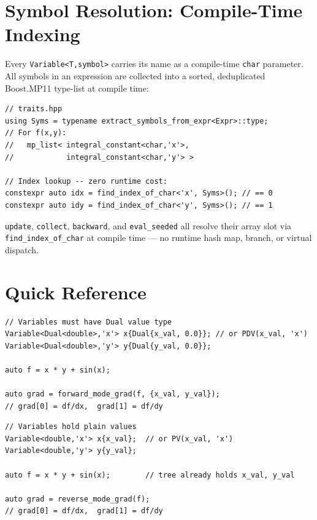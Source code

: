 \documentclass[11pt,a4paper]{article}
\newcommand{\code}[1]{\texttt{#1}}
\begin{document}
\section{Symbol Resolution: Compile-Time Indexing}
\label{sec:symbols}

Every \code{Variable<T,symbol>} carries its name as a compile-time \code{char}
parameter.  All symbols in an expression are collected into a sorted,
deduplicated Boost.MP11 type-list at compile time:

\begin{lstlisting}
// traits.hpp
using Syms = typename extract_symbols_from_expr<Expr>::type;
// For f(x,y):
//   mp_list< integral_constant<char,'x'>,
//            integral_constant<char,'y'> >

// Index lookup -- zero runtime cost:
constexpr auto idx = find_index_of_char<'x', Syms>(); // == 0
constexpr auto idy = find_index_of_char<'y', Syms>(); // == 1
\end{lstlisting}

\code{update}, \code{collect}, \code{backward}, and \code{eval\_seeded} all
resolve their array slot via \code{find\_index\_of\_char} at compile time ---
no runtime hash map, branch, or virtual dispatch.

\section{Quick Reference}
\label{sec:qref}

\begin{tcolorbox}[defbox={Forward mode: setup}]
\begin{lstlisting}
// Variables must have Dual value type
Variable<Dual<double>,'x'> x{Dual{x_val, 0.0}}; // or PDV(x_val, 'x')
Variable<Dual<double>,'y'> y{Dual{y_val, 0.0}};

auto f = x * y + sin(x);

auto grad = forward_mode_grad(f, {x_val, y_val});
// grad[0] = df/dx,  grad[1] = df/dy
\end{lstlisting}
\end{tcolorbox}

\begin{tcolorbox}[defbox={Reverse mode: setup}]
\begin{lstlisting}
// Variables hold plain values
Variable<double,'x'> x{x_val};  // or PV(x_val, 'x')
Variable<double,'y'> y{y_val};

auto f = x * y + sin(x);        // tree already holds x_val, y_val

auto grad = reverse_mode_grad(f);
// grad[0] = df/dx,  grad[1] = df/dy
\end{lstlisting}
\end{tcolorbox}
\end{document}
